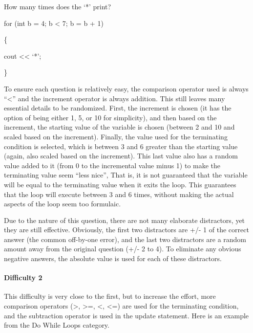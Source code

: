 \documentclass{article}
\begin{document}
\hfill \par
How many times does the `*' print? \par
for (int b = 4; b \textless{}  7; b = b + 1) \par
\{ \par
\indent\indent cout \textless\textless{} `*'; \par
\} \par
\hfill \par

To ensure each question is relatively easy, the comparison operator used is always ``\textless{}'' and the increment operator is always addition. This still leaves many essential details to be 
randomized. First, the increment is chosen (it has the option of being either 1, 5, or 10 for simplicity), and then based on the increment, the starting value of the variable is chosen (between 2 and 10 and scaled based on the increment). Finally, the value used for the terminating condition is selected, which is between 3 and 6 greater than the starting value (again, also scaled based 
on the increment). This last value also has a random value added to it (from 0 to the incremental value minus 1) to make the terminating value seem ``less nice'', That is, it is not guaranteed
that the variable will be equal to the terminating value when it exits the loop. This guarantees that the loop will execute between 3 and 6 times, without making the actual aspects of the loop 
seem too formulaic. 

Due to the nature of this question, there are not many elaborate distractors, yet they are still effective. Obviously, the first two distractors are +/- 1 of the correct answer (the common 
off-by-one error), and the last two distractors are a random amount away from the original question (+/- 2 to 4). To eliminate any obvious negative answers, the absolute value is used for each of these distractors. 

\paragraph{Difficulty 2} \hfill \par
This difficulty is very close to the first, but to increase the effort, more comparison operators (\textgreater, \textgreater =, \textless , \textless =) are used for the terminating condition, and the subtraction operator is used in the update
statement. Here is an example from the Do While Loops category.
\end{document}
